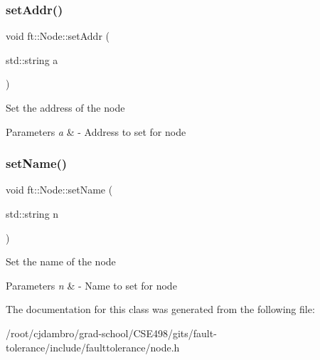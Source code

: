 \subsubsection{\texorpdfstring{set\+Addr()}{setAddr()}}
{\footnotesize\ttfamily void ft\+::\+Node\+::set\+Addr (\begin{DoxyParamCaption}\item[{std\+::string}]{a }\end{DoxyParamCaption})\hspace{0.3cm}{\ttfamily [inline]}}

Set the address of the node


\begin{DoxyParams}{Parameters}
{\em a} & -\/ Address to set for node \\
\hline
\end{DoxyParams}
\mbox{\label{classft_1_1Node_a0a09f86d4b043b0da034e7da0d83463c}} 
\subsubsection{\texorpdfstring{set\+Name()}{setName()}}
{\footnotesize\ttfamily void ft\+::\+Node\+::set\+Name (\begin{DoxyParamCaption}\item[{std\+::string}]{n }\end{DoxyParamCaption})\hspace{0.3cm}{\ttfamily [inline]}}

Set the name of the node


\begin{DoxyParams}{Parameters}
{\em n} & -\/ Name to set for node \\
\hline
\end{DoxyParams}


The documentation for this class was generated from the following file\+:\begin{DoxyCompactItemize}
\item 
/root/cjdambro/grad-\/school/\+C\+S\+E498/gits/fault-\/tolerance/include/faulttolerance/node.\+h\end{DoxyCompactItemize}
